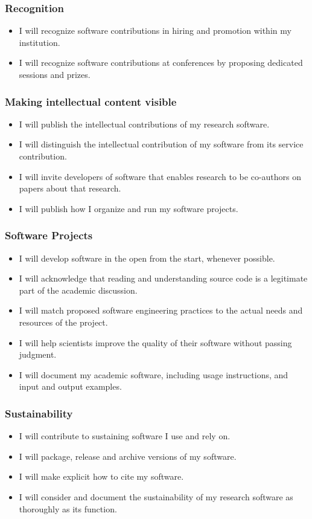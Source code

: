 \documentclass[a4paper,UKenglish]{dagman}
\renewcommand{\paragraph}[1]{\subsubsection*{#1}\xspace}
\begin{document}
\paragraph{Recognition}
\begin{itemize}
\item I will recognize software contributions in hiring and promotion within my institution.
\item I will recognize software contributions at conferences by proposing dedicated sessions and prizes.
\end{itemize}

\paragraph{Making intellectual content visible}
\begin{itemize}
\item I will publish the intellectual contributions of my research software.
\item I will distinguish the intellectual contribution of my software from its service contribution.
\item I will invite developers of software that enables research to be co-authors on papers about that research.
\item I will publish how I organize and run my software projects.
\end{itemize}

\paragraph{Software Projects}
\begin{itemize}
\item I will develop software in the open from the start, whenever possible.
\item I will acknowledge that reading and understanding source code is a legitimate part of the academic discussion.
\item I will match proposed software engineering practices to the actual needs and resources of the project.
\item I will help scientists improve the quality of their software without passing judgment.
\item I will document my academic software, including usage instructions, and input and output examples.
\end{itemize}

\paragraph{Sustainability}
\begin{itemize}
\item I will contribute to sustaining software I use and rely on. 
\item I will package, release and archive versions of my software.
\item I will make explicit how to cite my software.
\item I will consider and document the sustainability of my research software as thoroughly as its function.
\end{itemize}
\end{document}
